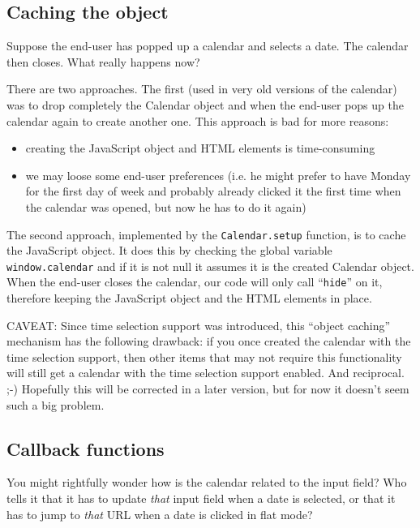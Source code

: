 \documentclass[a4paper,10pt]{article}
\begin{document}
\subsection{Caching the object}

Suppose the end-user has popped up a calendar and selects a date.  The calendar
then closes.  What really happens now?

There are two approaches.  The first (used in very old versions of the
calendar) was to drop completely the Calendar object and when the end-user pops
up the calendar again to create another one.  This approach is bad for more
reasons:

\begin{itemize}

\item creating the JavaScript object and HTML elements is time-consuming

\item we may loose some end-user preferences (i.e. he might prefer to have
Monday for the first day of week and probably already clicked it the first time
when the calendar was opened, but now he has to do it again)

\end{itemize}

The second approach, implemented by the \texttt{Calendar.setup} function, is to
cache the JavaScript object.  It does this by checking the global variable
\texttt{window.calendar} and if it is not null it assumes it is the created
Calendar object.  When the end-user closes the calendar, our code will only
call ``\texttt{hide}'' on it, therefore keeping the JavaScript object and the
HTML elements in place.

{\color{red} CAVEAT:} \quad Since time selection support was introduced, this
``object caching'' mechanism has the following drawback: if you once created
the calendar with the time selection support, then other items that may not
require this functionality will still get a calendar with the time selection
support enabled.  And reciprocal. ;-)  Hopefully this will be corrected in a
later version, but for now it doesn't seem such a big problem.

\subsection{Callback functions}

You might rightfully wonder how is the calendar related to the input field?
Who tells it that it has to update \emph{that} input field when a date is
selected, or that it has to jump to \emph{that} URL when a date is clicked in
flat mode?
\end{document}
